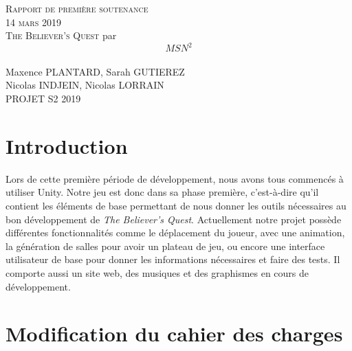 \documentclass[]{extarticle}
\begin{document}
\begin{spacing}{1.25}

\textsc{ }\\
\textsc{ }\\
\textsc{ }\\
\textsc{ }\\
\textsc{ }\\

\begin{center}
\textsc{\LARGE Rapport de première soutenance} \\
\bigbreak
\textsc{\LARGE 14 mars 2019} \\
\bigbreak
\bigbreak
\bigbreak
\bigbreak
\bigbreak
\bigbreak
\bigbreak
\textsc{\Huge The Believer's Quest}
\bigbreak
\bigbreak
\bigbreak
\bigbreak
\bigbreak
\bigbreak
\bigbreak
\bigbreak
\bigbreak
par \\ 
\[MSN^{2}\]\\
Maxence PLANTARD, Sarah GUTIEREZ \\
Nicolas INDJEIN, Nicolas LORRAIN \\
\bigbreak
\bigbreak
\bigbreak
PROJET S2 2019
\end{center}
\newpage

\renewcommand{\contentsname}{Sommaire}
\tableofcontents
\newpage

\section{Introduction}
\bigbreak
\bigbreak

Lors de cette première période de développement, nous avons tous commencés à utiliser Unity. Notre jeu est donc dans sa phase première, c’est-à-dire qu’il contient les éléments de base permettant de nous donner les outils nécessaires au bon développement de \textit{The Believer’s Quest}. Actuellement notre projet possède différentes fonctionnalités comme le déplacement du joueur, avec une animation, la génération de salles pour avoir un plateau de jeu, ou encore une interface utilisateur de base pour donner les informations nécessaires et faire des tests. Il comporte aussi un site web, des musiques et des graphismes en cours de développement. 
\bigbreak
\bigbreak
\bigbreak
\bigbreak
\bigbreak
\bigbreak

\section{Modification du cahier des charges}


\end{spacing}
\end{document}

